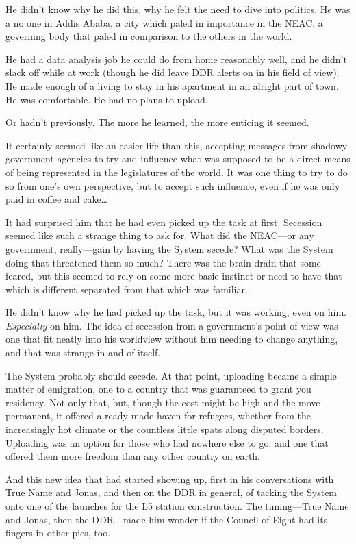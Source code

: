 He didn't know why he did this, why he felt the need to dive into politics. He was a no one in Addis Ababa, a city which paled in importance in the NEAC, a governing body that paled in comparison to the others in the world.

He had a data analysis job he could do from home reasonably well, and he didn't slack off while at work (though he did leave DDR alerts on in his field of view). He made enough of a living to stay in his apartment in an alright part of town. He was comfortable. He had no plans to upload.

Or hadn't previously. The more he learned, the more enticing it seemed.

It certainly seemed like an easier life than this, accepting messages from shadowy government agencies to try and influence what was supposed to be a direct means of being represented in the legislatures of the world. It was one thing to try to do so from one's own perspective, but to accept such influence, even if he was only paid in coffee and cake\ldots{}

It had surprised him that he had even picked up the task at first. Secession seemed like such a strange thing to ask for. What did the NEAC---or any government, really---gain by having the System secede? What was the System doing that threatened them so much? There was the brain-drain that some feared, but this seemed to rely on some more basic instinct or need to have that which is different separated from that which was familiar.

He didn't know why he had picked up the task, but it was working, even on him. \emph{Especially} on him. The idea of secession from a government's point of view was one that fit neatly into his worldview without him needing to change anything, and that was strange in and of itself.

The System probably should secede. At that point, uploading became a simple matter of emigration, one to a country that was guaranteed to grant you residency. Not only that, but, though the cost might be high and the move permanent, it offered a ready-made haven for refugees, whether from the increasingly hot climate or the countless little spats along disputed borders. Uploading was an option for those who had nowhere else to go, and one that offered them more freedom than any other country on earth.

And this new idea that had started showing up, first in his conversations with True Name and Jonas, and then on the DDR in general, of tacking the System onto one of the launches for the L5 station construction. The timing---True Name and Jonas, then the DDR---made him wonder if the Council of Eight had its fingers in other pies, too.

